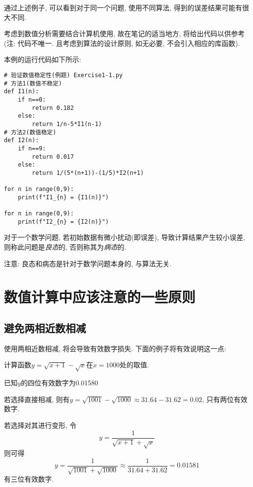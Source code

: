 通过上述例子, 可以看到对于同一个问题, 使用不同算法, 得到的误差结果可能有很大不同.

\begin{extend}
    考虑到数值分析需要结合计算机使用, 故在笔记的适当地方, 将给出代码以供参考(注: 代码不唯一. 且考虑到算法的设计原则, 如无必要, 不会引入相应的库函数). 

    本例的运行代码如下所示:

    \begin{lstlisting}
# 验证数值稳定性(例题) Exercise1-1.py
# 方法1(数值不稳定)
def I1(n):
    if n==0:
        return 0.182
    else:
        return 1/n-5*I1(n-1)
# 方法2(数值稳定)  
def I2(n):
    if n==9:
        return 0.017
    else:
        return 1/(5*(n+1))-(1/5)*I2(n+1)

for n in range(0,9):
    print(f"I1_{n} = {I1(n)}")

for n in range(0,9):
    print(f"I2_{n} = {I2(n)}")
    \end{lstlisting}
\end{extend}

\begin{definition}[良态与病态]
    对于一个数学问题, 若初始数据有微小扰动(即误差), 导致计算结果产生较小误差, 则称此问题是\emph{良态}的, 否则称其为\emph{病态}的.
\end{definition}

注意: 良态和病态是针对于数学问题本身的, 与算法无关. 

\section{数值计算中应该注意的一些原则}

\subsection{避免两相近数相减}

使用两相近数相减, 将会导致有效数字损失. 下面的例子将有效说明这一点:

\begin{example}
    计算函数$y=\sqrt{x+1}-\sqrt{x}$在$x=1000$处的取值.

    已知$y$的四位有效数字为0.01580
\end{example}

\begin{solution}
    若选择直接相减, 则有$y=\sqrt{1001}-\sqrt{1000}\approx31.64-31.62=0.02$, 只有两位有效数字.

    若选择对其进行变形, 令
    \begin{equation*}
        y=\frac{1}{\sqrt{x+1}+\sqrt{x}}
    \end{equation*}
    则可得
    \begin{equation*}
        y = \frac{1}{\sqrt{1001}+\sqrt{1000}}\approx\frac{1}{31.64+31.62}=0.01581
    \end{equation*}
    有三位有效数字.
\end{solution}

